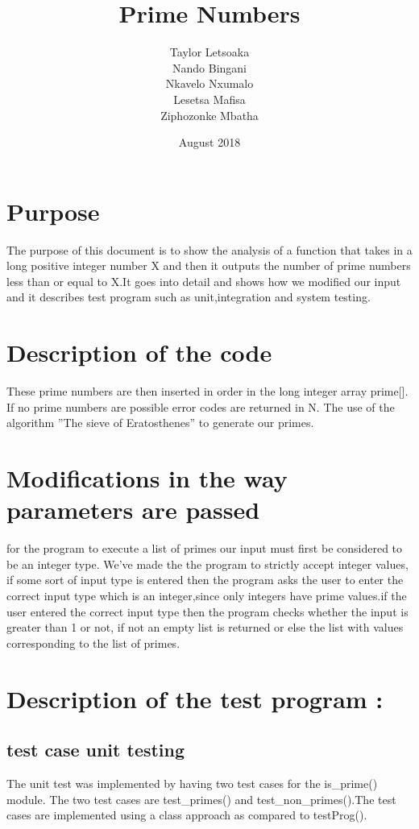 \documentclass{article}
\title{Prime Numbers}
\author{Taylor Letsoaka\\Nando Bingani\\Nkavelo Nxumalo\\Lesetsa Mafisa\\Ziphozonke Mbatha}
\date{August 2018}
\begin{document}
\maketitle
\clearpage
\tableofcontents
\newpage

\section{Purpose}
\large{The purpose of this document is to show the analysis of a function that takes in a long positive integer number X and then it outputs the number of prime numbers less than or equal to X.It goes into detail and shows how we modified our input and it describes test program such as unit,integration and system testing.}
\section{Description of the code}
\large{These prime numbers are then inserted in order in the
long integer array prime[]. If no prime numbers are possible error codes are returned in N. The use of the algorithm ”The sieve of Eratosthenes” to generate our primes.}
\section{ Modifications in the way parameters are passed}
\large{for the program to execute a list of primes our input must first be considered to be an integer type. We've
made the the program to strictly accept integer values, if some sort of input type is entered then the program 
asks the user to enter the correct input type which is an  integer,since only integers have prime values.if the user entered the correct input type then the program checks whether the input is greater than 1 or not, if not an  empty list is returned or else the list with values corresponding to the list of primes.
 }
\section{Description of the test program :}
\subsection{test case unit testing}
\large{The unit test was implemented by having two test cases for the is\_prime() module. The two test cases are test\_primes() and test\_non\_primes().The test cases are implemented using a class approach as compared to testProg().}
\end{document}

